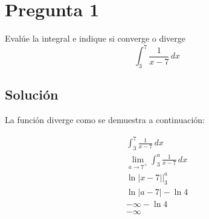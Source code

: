\section{Pregunta 1}
\noindent Evalúe la integral e indique si converge o diverge
\[
  \int_3^7 \frac{1}{x-7} \, dx
\]

\subsection{Solución}
\noindent La función diverge como se demuestra a continuación:

\begin{gather*}
  \int_3^7 \frac{1}{x-7} \, dx \\
  \lim_{a \to 7^+} \int_3^a \frac{1}{x-7} \, dx \\
  \ln|x-7| \Big|_3^a \\
  \ln|a-7| - \ln 4 \\
  -\infty - \ln 4 \\
  -\infty
\end{gather*}

\newpage  